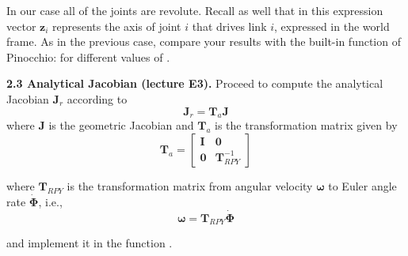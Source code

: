 \documentclass[11pt]{article}
\begin{document}
In our case all of the joints are revolute. Recall as well that in this expression vector $\mathbf{z}_i$ represents the axis of joint $i$ that drives link $i$, expressed in the world frame. As in the previous case, compare your results with the built-in function of Pinocchio:
 for different values of .

\textbf{2.3 Analytical Jacobian (lecture E3).} Proceed to compute the analytical Jacobian $\mathbf{J}_r$ according to 
\begin{equation*}
	\mathbf{J}_r = \mathbf{T}_a \mathbf{J}
\end{equation*}
where $\mathbf{J}$ is the geometric Jacobian and $\mathbf{T}_a$ is the transformation matrix given by
\begin{equation*}
	\mathbf{T}_a = \begin{bmatrix}
		\mathbf{I} & \mathbf{0} \\
		\mathbf{0} & \mathbf{T}_{RPY}^{-1}
	\end{bmatrix}
\end{equation*}

where $\mathbf{T}_{RPY}$ is the transformation matrix from angular velocity $\boldsymbol{\omega}$ to Euler angle rate $\dot{\mathbf{\Phi}}$, i.e.,
\begin{equation*}
	\boldsymbol{\omega} = \mathbf{T}_{RPY} \dot{\mathbf{\Phi}}
\end{equation*}

and implement it in the function .\\
\end{document}
